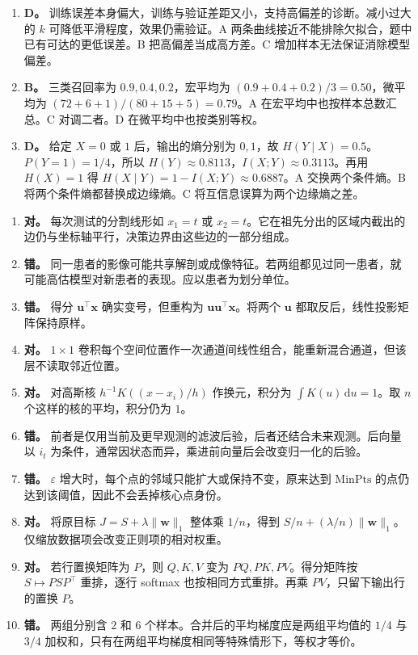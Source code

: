 \begin{enumerate}[label=\arabic*.]
\item \textbf{D。} 训练误差本身偏大，训练与验证差距又小，支持高偏差的诊断。减小过大的 $k$ 可降低平滑程度，效果仍需验证。A 两条曲线接近不能排除欠拟合，题中已有可达的更低误差。B 把高偏差当成高方差。C 增加样本无法保证消除模型偏差。
\item \textbf{B。} 三类召回率为 $0.9,0.4,0.2$，宏平均为 $(0.9+0.4+0.2)/3=0.50$，微平均为 $(72+6+1)/(80+15+5)=0.79$。A 在宏平均中也按样本总数汇总。C 对调二者。D 在微平均中也按类别等权。
\item \textbf{D。} 给定 $X=0$ 或 $1$ 后，输出的熵分别为 $0,1$，故 $H(Y\mid X)=0.5$。$P(Y=1)=1/4$，所以 $H(Y)\approx0.8113$，$I(X;Y)\approx0.3113$。再用 $H(X)=1$ 得 $H(X\mid Y)=1-I(X;Y)\approx0.6887$。A 交换两个条件熵。B 将两个条件熵都替换成边缘熵。C 将互信息误算为两个边缘熵之差。
\end{enumerate}

\begin{enumerate}[label=\arabic*.,start=11]
\item \textbf{对。} 每次测试的分割线形如 $x_1=t$ 或 $x_2=t$。它在祖先分出的区域内截出的边仍与坐标轴平行，决策边界由这些边的一部分组成。
\item \textbf{错。} 同一患者的影像可能共享解剖或成像特征。若两组都见过同一患者，就可能高估模型对新患者的表现。应以患者为划分单位。
\item \textbf{错。} 得分 $\bm u^\top\bm x$ 确实变号，但重构为 $\bm u\bm u^\top\bm x$。将两个 $\bm u$ 都取反后，线性投影矩阵保持原样。
\item \textbf{对。} $1\times1$ 卷积每个空间位置作一次通道间线性组合，能重新混合通道，但该层不读取邻近位置。
\item \textbf{对。} 对高斯核 $h^{-1}K((x-x_i)/h)$ 作换元，积分为 $\int K(u)\,\mathrm du=1$。取 $n$ 个这样的核的平均，积分仍为 $1$。
\item \textbf{错。} 前者是仅用当前及更早观测的滤波后验，后者还结合未来观测。后向量以 $i_t$ 为条件，通常因状态而异，乘进前向量后会改变归一化的后验。
\item \textbf{错。} $\varepsilon$ 增大时，每个点的邻域只能扩大或保持不变，原来达到 $\mathrm{MinPts}$ 的点仍达到该阈值，因此不会丢掉核心点身份。
\item \textbf{对。} 将原目标 $J=S+\lambda\|\bm w\|_1$ 整体乘 $1/n$，得到 $S/n+(\lambda/n)\|\bm w\|_1$。仅缩放数据项会改变正则项的相对权重。
\item \textbf{对。} 若行置换矩阵为 $P$，则 $Q,K,V$ 变为 $PQ,PK,PV$。得分矩阵按 $S\mapsto PSP^\top$ 重排，逐行 softmax 也按相同方式重排。再乘 $PV$，只留下输出行的置换 $P$。
\item \textbf{错。} 两组分别含 $2$ 和 $6$ 个样本。合并后的平均梯度应是两组平均值的 $1/4$ 与 $3/4$ 加权和，只有在两组平均梯度相同等特殊情形下，等权才等价。
\end{enumerate}

